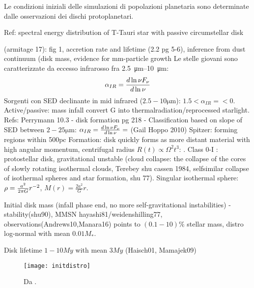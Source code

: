 Le condizioni iniziali delle simulazioni di popolazioni planetaria sono determinate dalle osservazioni dei dischi protoplanetari.

\begin{workout}
Ref: spectral energy distribution of T-Tauri star with passive circumstellar disk
\end{workout}

\begin{workout}
(armitage 17): fig 1, accretion rate and lifetime (2.2 pg 5-6), inference from dust continuum (disk mass, evidence for mm-particle growth
Le stelle giovani sono caratterizzate da eccesso infrarosso fra \SIrange{2.5}{10}{\micro\meter}:
\begin{equation}
\alpha_{IR}=\frac{d \ln{\nu F_{\nu}}}{d \ln{\nu}}
\end{equation}
Sorgenti con SED declinante in mid infrared ($2.5-10\si{\micro\meter}$): $1.5<\alpha_{IR}=<0$. Active/passive: mass infall convert G into thermalradiation/reprocessed starlight.
Refs: Perrymann 10.3 - disk formation pg 218 - 
Classification based on slope of SED between $2-25\si{\micro\meter}$: $\alpha_{IR}=\frac{d \ln{\nu F_{\nu}}}{d \ln{\nu}}=$ (Gail Hoppo 2010)
Spitzer: forming regions within 500pc
Formation: disk quickly forms as more distant material with high angular momentum, centrifugal radius $R(t)\propto\Omega^2 t^3$: . Class 0-I : protostellar disk, gravitational unstable (cloud collapse: the collapse of the cores of slowly rotating isothermal clouds, Terebey shu cassen 1984, selfsimilar collapse of isothermal spheres and star formation, shu 77). Singular isothermal sphere: $\rho=\frac{a^2}{2\pi G}r^{-2}$, $M(r)=\frac{2a^2}{G}r$.
\end{workout}

\begin{workout}

Initial disk mass
(infall phase end, no more self-gravitational instabilities) - stability(shu90), MMSN hayashi81/weidenshilling77, observations(Andrews10,Manara16) points to $(0.1-10)\%$ stellar mass, distro log-normal with mean $0.01M_*$.

{Disk lifetime}
$1-10My$ with mean $3My$ (Haisch01, Mamajek09)

\begin{figure}[!ht]\texttt{[image: initdistro]}\label{fig:initdistro}\caption{Da \cite{mordasini2018planetary}.}\end{figure}

\end{workout}

